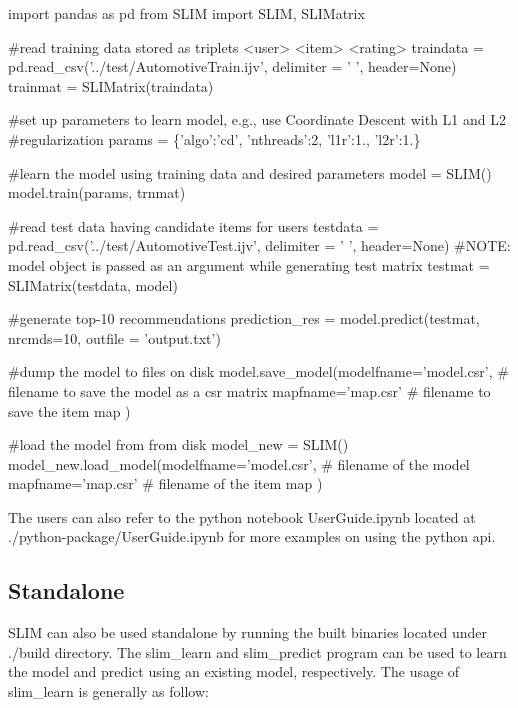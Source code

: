 \begin{DoxyCode}
\textcolor{keyword}{import} pandas \textcolor{keyword}{as} pd
\textcolor{keyword}{from} SLIM \textcolor{keyword}{import} SLIM, SLIMatrix

\textcolor{comment}{#read training data stored as triplets <user> <item> <rating>}
traindata = pd.read\_csv(\textcolor{stringliteral}{'../test/AutomotiveTrain.ijv'}, delimiter = \textcolor{stringliteral}{' '}, header=\textcolor{keywordtype}{None})
trainmat = SLIMatrix(traindata)

\textcolor{comment}{#set up parameters to learn model, e.g., use Coordinate Descent with L1 and L2}
\textcolor{comment}{#regularization}
params = \{\textcolor{stringliteral}{'algo'}:\textcolor{stringliteral}{'cd'}, \textcolor{stringliteral}{'nthreads'}:2, \textcolor{stringliteral}{'l1r'}:1., \textcolor{stringliteral}{'l2r'}:1.\}

\textcolor{comment}{#learn the model using training data and desired parameters}
model = SLIM()
model.train(params, trnmat)

\textcolor{comment}{#read test data having candidate items for users}
testdata = pd.read\_csv(\textcolor{stringliteral}{'../test/AutomotiveTest.ijv'}, delimiter = \textcolor{stringliteral}{' '}, header=\textcolor{keywordtype}{None})
\textcolor{comment}{#NOTE: model object is passed as an argument while generating test matrix}
testmat = SLIMatrix(testdata, model)

\textcolor{comment}{#generate top-10 recommendations}
prediction\_res = model.predict(testmat, nrcmds=10, outfile = \textcolor{stringliteral}{'output.txt'})

\textcolor{comment}{#dump the model to files on disk}
model.save\_model(modelfname=\textcolor{stringliteral}{'model.csr'}, \textcolor{comment}{# filename to save the model as a csr matrix}
                 mapfname=\textcolor{stringliteral}{'map.csr'} \textcolor{comment}{# filename to save the item map}
                )

\textcolor{comment}{#load the model from from disk}
model\_new = SLIM()
model\_new.load\_model(modelfname=\textcolor{stringliteral}{'model.csr'}, \textcolor{comment}{# filename of the model}
                 mapfname=\textcolor{stringliteral}{'map.csr'} \textcolor{comment}{# filename of the item map}
                )
\end{DoxyCode}


The users can also refer to the python notebook {\ttfamily User\+Guide.\+ipynb} located at {\ttfamily ./python-\/package/\+User\+Guide.ipynb} for more examples on using the python api.\hypertarget{index_standalone_getting_Started}{}\subsection{Standalone}\label{index_standalone_getting_Started}
S\+L\+IM can also be used standalone by running the built binaries located under {\ttfamily ./build} directory. The {\ttfamily slim\+\_\+learn} and {\ttfamily slim\+\_\+predict} program can be used to learn the model and predict using an existing model, respectively. The usage of {\ttfamily slim\+\_\+learn} is generally as follow\+:

